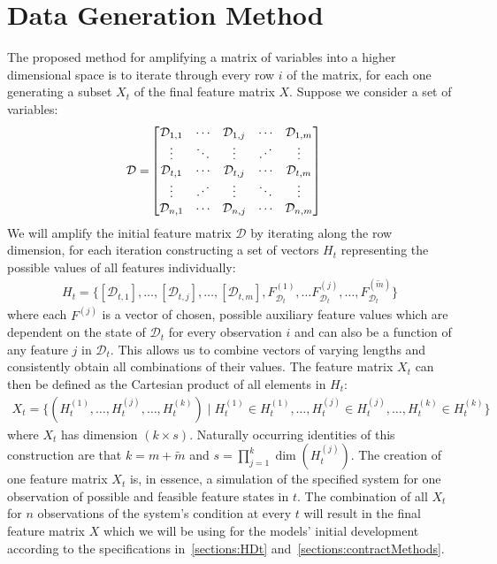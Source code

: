 \documentclass[11pt]{article}
\newcommand{\D}{\mathcal{D}}
\begin{document}
\section{Data Generation Method}
	\label{sections:DataGenMeth}
	The proposed method for amplifying a matrix of variables into a higher dimensional space is to iterate through every row $i$ of the matrix, for each one generating a subset $X_{t}$ of the final feature matrix $X$.
	Suppose we consider a set of variables:
	\begin{align}
		\D = & 
		\begin{bmatrix}
			\D_{1,
				1} & \cdots & \D_{1,j} & \cdots & \D_{1,m} \\
			\vdots  & \ddots & \vdots & \reflectbox{$\ddots$} & \vdots  \\
			\D_{t,1} & \cdots & \D_{t,j} & \cdots & \D_{t,m}\\
			\vdots  & \reflectbox{$\ddots$} & \vdots & \ddots & \vdots \\
			\D_{n,1} & \cdots & \D_{n,j} & \cdots & \D_{n,m}
		\end{bmatrix} \label{eq:D}
	\end{align}
	We will amplify the initial feature matrix $\D$ by iterating along the row dimension, for each iteration constructing a set of vectors $H_{t}$ representing the possible values of all features individually:
	\begin{align}
		H_{t} = \{ \left[\D_{t,1}\right], \ldots, \left[\D_{t,j}\right], \ldots, \left[\D_{t,m}\right], F^{(1)}_{\D_{t}}, \ldots F^{(j)}_{\D_{t}}, \ldots, F^{(\tilde{m})}_{\D_{t}} \} \label{eq:Ht}
	\end{align}
	where each $F^{(j)}$ is a vector of chosen, possible auxiliary feature values which are dependent on the state of $\D_{t}$ for every observation $i$ and can also be a function of any feature $j$ in $\D_{t}$. This allows us to combine vectors of varying lengths and consistently obtain all combinations of their values. The feature matrix $X_{t}$ can then be defined as the Cartesian product of all elements in $H_{t}$:
	\begin{equation}
		\begin{aligned}
			X_{t} = \{ (H_{t}^{(1)}, \ldots, H_{t}^{(j)}, \ldots, H_{t}^{(k)}) \mid H_{t}^{(1)} \in H_{t}^{(1)}, \ldots, H_{t}^{(j)} \in H_{t}^{(j)}, \ldots, H_{t}^{(k)} \in H_{t}^{(k)} \} \label{eq:Xt}
		\end{aligned}
	\end{equation}
	where $X_{t}$ has dimension $(k \times s)$. Naturally occurring identities of this construction are that $k = m + \tilde{m}$ and $s = \prod_{j=1}^k \dim(H_{t}^{(j)})$.
	The creation of one feature matrix $X_{t}$ is, in essence, a simulation of the specified system for one observation of possible and feasible feature states in $t$. The combination of all $X_{t}$ for $n$ observations of the system's condition at every $t$ will result in the final feature matrix $X$ which we will be using for the models' initial development according to the specifications in~\ref{sections:HDt} and~\ref{sections:contractMethods}.
	
\end{document}
